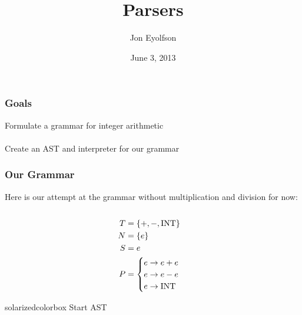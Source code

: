 \documentclass[aspectratio=169]{beamer}
\title{Parsers}
\author{Jon Eyolfson}
\date{June 3, 2013}
\institute{University of Waterloo}
\begin{document}
\begin{frame}
  \titlepage
\end{frame}

\begin{frame}
\frametitle{Goals}

Formulate a grammar for integer arithmetic\\~\\

Create an AST and interpreter for our grammar
\end{frame}

\begin{frame}
\frametitle{Our Grammar}

Here is our attempt at the grammar without multiplication and division for now:
\\~\\

\begin{align*}
T &= \{ +, -, \text{\lstinline{INT}} \}\\
N &= \{ e \}\\
S &= e\\
P &= \begin{cases}e \rightarrow e + e \\
     e \rightarrow e - e\\
     e \rightarrow \text{\lstinline{INT}}\end{cases}
\end{align*}
\end{frame}

\begin{frame}
  \begin{beamercolorbox}[wd=\paperwidth, sep=2em]{solarizedcolorbox}
    { \hfill Start AST}
  \end{beamercolorbox}
\end{frame}
\end{document}
